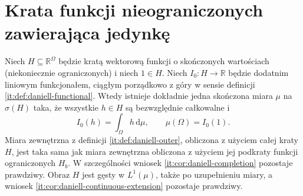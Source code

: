 \section{Krata funkcji nieograniczonych zawierająca jedynkę}

\begin{twierdzenie}
\label{it:thm:daniell-unbounded-unit}
Niech $H\subseteq\mathbb{R}^\Omega$ będzie kratą wektorową
funkcji o skończonych wartościach (niekoniecznie
ograniczonych) i niech $1\in H$. Niech $I_0:H\to\mathbb{R}$
będzie dodatnim liniowym funkcjonałem, ciągłym
porządkowo z góry w sensie definicji
\ref{it:def:daniell-functional}.
Wtedy istnieje dokładnie jedna skończona miara $\mu$
na $\sigma(H)$ taka, że wszystkie $h\in H$ są
bezwzględnie całkowalne i
\[
 I_0(h)=\int_\Omega h\,\mathrm d\mu,\qquad
 \mu(\Omega)=I_0(1).
\]
Miara zewnętrzna z definicji \ref{it:def:daniell-outer},
obliczona z użyciem całej kraty $H$, jest taka sama
jak miara zewnętrzna obliczona z użyciem jej
podkraty funkcji ograniczonych $H_b$.
W szczególności wniosek \ref{it:cor:daniell-completion}
pozostaje prawdziwy. Obraz $H$ jest gęsty w $L^1(\mu)$,
także po uzupełnieniu miary, a wniosek
\ref{it:cor:daniell-continuous-extension}
pozostaje prawdziwy.
\end{twierdzenie}
